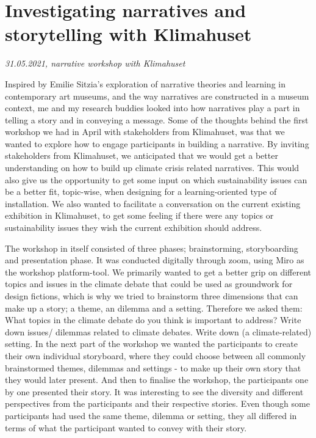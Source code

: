 \section{Investigating narratives and storytelling with Klimahuset}
\par
\emph{31.05.2021, narrative workshop with Klimahuset}
\par

Inspired by Emilie Sitzia’s exploration of narrative theories and learning in contemporary art museums, and the way narratives are constructed in a museum context, me and my research buddies looked into how narratives play a part in telling a story and in conveying a message. Some of the thoughts behind the first workshop we had in April with stakeholders from Klimahuset, was that we wanted to explore how to engage participants in building a narrative. By inviting stakeholders from Klimahuset, we anticipated that we would get a better understanding on how to build up climate crisis related narratives. This would also give us the opportunity to get some input on which sustainability issues can be a better fit, topic-wise, when designing for a learning-oriented type of installation. We also wanted to facilitate a conversation on the current existing exhibition in Klimahuset, to get some feeling if there were any topics or sustainability issues they wish the current exhibition should address.

The workshop in itself consisted of three phases; brainstorming, storyboarding and presentation phase. It was conducted digitally through zoom, using Miro as the workshop platform-tool. We primarily wanted to get a better grip on different topics and issues in the climate debate that could be used as groundwork for design fictions, which is why we tried to brainstorm three dimensions that can make up a story; a theme, an dilemma and a setting. Therefore we asked them:
What topics in the climate debate do you think is important to address?
Write down issues/ dilemmas related to climate debates.
Write down (a climate-related) setting.
In the next part of the workshop we wanted the participants to create their own individual storyboard, where they could choose between all commonly brainstormed themes, dilemmas and settings - to make up their own story that they would later present. And then to finalise the workshop, the participants one by one presented their story. It was interesting to see the diversity and different perspectives from the participants and their respective stories. Even though some participants had used the same theme, dilemma or setting, they all differed in terms of what the participant wanted to convey with their story. 


